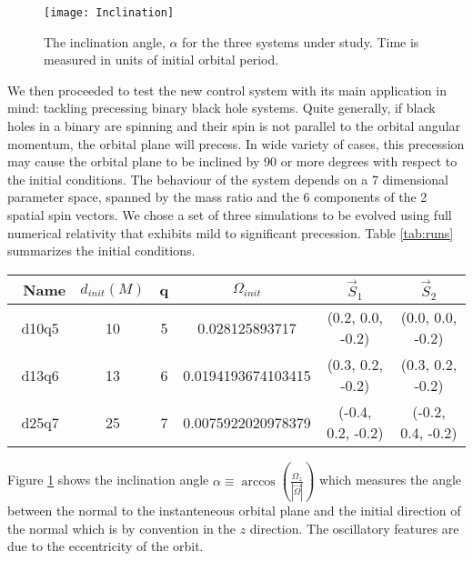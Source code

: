\documentclass[aps, prd, amsmath, floats, floatfix, twocolumn,superscriptaddress, nofootinbib, showpacs]{revtex4-1}
\theoremstyle{plain}
\theoremstyle{definition}
\begin{document}
\begin{figure}[!h]
  \texttt{[image: Inclination]}
  \caption{The inclination angle, $\alpha$ for the three systems under study. Time is measured in units of initial orbital period. }
  \label{fig:inclination}
\end{figure}
We then proceeded to test the new control system with its main application in mind:
tackling precessing binary black hole systems. Quite generally, if black holes
in a binary are spinning and their spin is not parallel to the orbital angular
momentum, the orbital plane will precess. In wide variety of cases, this precession may cause the orbital plane to be inclined by 90 or more degrees with respect to the initial conditions. The behaviour of the system depends on a 7 dimensional parameter space, spanned by the mass ratio and the 6 components of the 2 spatial spin vectors. We chose a set of three simulations to be evolved using full numerical relativity that exhibits mild to significant precession. Table \ref{tab:runs} summarizes the initial conditions. \\

\begin{table*}
  \setlength{\tabcolsep}{1em}
  \begin{tabular}{c|c|c|c|c|c}
   \
   Name & $d_{init}(M)$ & q & $\Omega_{init}$ & $\vec{S}_{1}$ & $\vec{S}_{2}$ \\
   \hline
   d10q5 & 10 & 5 & 0.028125893717 & (0.2, 0.0, -0.2) & (0.0, 0.0, -0.2) \\
   
   d13q6 & 13 & 6 & 0.0194193674103415 & (0.3, 0.2,  -0.2)  & (0.3,   0.2,  -0.2)\\
   
   d25q7 & 25 & 7 & 0.0075922020978379 & (-0.4, 0.2, -0.2) & (-0.2, 0.4, -0.2)\\
   
   \end{tabular}
   \caption{The initial conditions used for the numerical relativity runs. The initial orbital angular momentum is in the $\hat{z}$ direction. Here
   $q=\frac{m1}{m2}$ is the mass ratio}
  \label{tab:runs}

\end{table*}

Figure \ref{fig:inclination} shows the inclination angle $\alpha \equiv  \arccos\left(\frac{\Omega_{z}}{|\vec{\Omega}|}\right)$ which measures the angle between the normal to the instanteneous orbital plane and the initial direction of the normal which is by convention in the $z$ direction. The oscillatory features are due to the 
eccentricity of the orbit.
 
\end{document}
